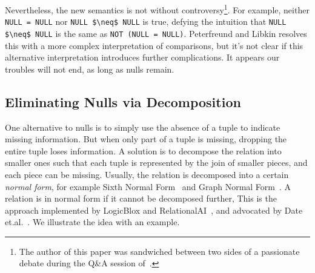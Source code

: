 \documentclass[sigconf]{acmart}
\begin{document}
Nevertheless, the new semantics is not without 
 controversy\footnote{The author of this paper was sandwiched between two sides of 
 a passionate debate during the Q\&A session of~\cite{DBLP:conf/pods/LibkinP23}.}.
For example, neither \lstinline|NULL = NULL| nor \lstinline|NULL $\neq$ NULL|
 is true, defying the intuition that \lstinline|NULL $\neq$ NULL|
 is the same as \lstinline|NOT (NULL = NULL)|.
Peterfreund and Libkin resolves this with
 a more complex interpretation of comparisons,
 but it's not clear if this alternative interpretation
 introduces further complications.
It appears our troubles will not end, 
 as long as nulls remain.

\subsection{Eliminating Nulls via Decomposition}
One alternative to nulls is to simply
 use the absence of a tuple to indicate missing information.
But when only part of a tuple is missing, 
 dropping the entire tuple loses information.
A solution is to decompose the relation into smaller ones
 such that each tuple is represented by the join 
 of smaller pieces, and each piece can be missing.
Usually, the relation is decomposed into a certain 
 {\em normal form}, 
 for example Sixth Normal Form~\cite{DBLP:books/daglib/0014409}
 and Graph Normal Form~\cite{RAIDocumentation}.
A relation is in normal form if it cannot be decomposed further,
This is the approach implemented by LogicBlox 
 and RelationalAI~\cite{RAIDocumentation,DBLP:conf/sigmod/ArefCGKOPVW15},
 and advocated by Date et.al.~\cite{DBLP:journals/sigmod/Date08,DBLP:books/daglib/0014409}.
We illustrate the idea with an example.

\end{document}
